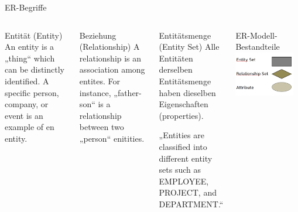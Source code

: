 \begin{frame}{ER-Begriffe~\parencite[9--12]{chen1976}}
  \begin{columns}[T,onlytextwidth]
    \footnotesize
      \begin{block}{Entität (Entity)}
       An entity is a „thing“ which can be distinctly identified. A specific person, company, or event is an example of en entity.
      \end{block}

      \begin{alertblock}{Beziehung (Relationship)}
        A relationship is an association among entites. For instance, „father-son“ is a relationship between two „person“ enitities.
      \end{alertblock}

      \begin{exampleblock}{Entitätsmenge (Entity Set)}
        Alle Entitäten derselben Entitätsmenge haben dieselben Eigenschaften (properties). 
        
        „Entities are classified into different entity sets such as EMPLOYEE, PROJECT, and DEPARTMENT.“
      \end{exampleblock}




      \begin{block}{ER-Modell-Bestandteile}
      \includegraphics[width=0.9\textwidth]{img/er-modell.png}
      \end{block}
      

\end{columns}
\end{frame}
